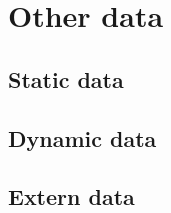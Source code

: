 \section{Other data} %
\subsection{Static data}

\subsection{Dynamic data}

\subsection{Extern data}